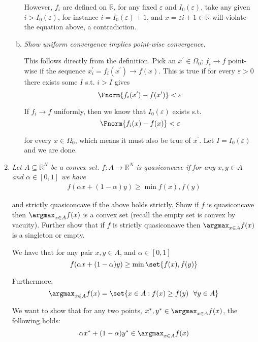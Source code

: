 \documentclass{article}
\begin{document}
\begin{enumerate}[1.]
\begin{enumerate}[a)]
        However, $f_i$ are defined on $\mathbb{R}$, for any fixed $\varepsilon$ and $I_0(\varepsilon)$, take any given $i > I_0(\varepsilon)$, for instance $i = I_0(\varepsilon) + 1$, and $x = \varepsilon i + 1 \in \mathbb{R}$ will violate the equation above, a contradiction.

      \item \textit{Show uniform convergence implies point-wise convergence.}

        \solution This follows directly from the definition. Pick an $x^\prime \in \Omega_0$; $f_i \to f$ point-wise if the sequence $x^\prime_i = f_i(x^\prime) \to f(x)$. This is true if for every $\varepsilon > 0$ there exists some $I$ s.t. $i > I$ gives
        \[
          \Fnorm{f_i(x^\prime) - f(x^\prime)} < \varepsilon
        \]

        If $f_i \to f$ uniformly, then we know that $I_0(\varepsilon)$ exists s.t.
        \[
          \Fnorm{f_i(x) - f(x)} < \varepsilon
        \]

        for every $x \in \Omega_0$, which means it must also be true of $x^\prime$. Let $I = I_0(\varepsilon)$ and we are done.
    \end{enumerate}

  \item {\itshape Let $A \subseteq \mathbb{R}^N$ be a convex set. $f: A \to \mathbb{R}^N$ is quasiconcave if for any $x, y \in A$ and $\alpha \in [0, 1]$ we have
      \begin{align*}
        f(\alpha x + (1 - \alpha) y) \ge \min{f(x), f(y)}
      \end{align*}

    and strictly quasiconcave if the above holds strictly. Show if $f$ is quasiconcave then $\argmax_{x \in A} f(x)$ is a convex set (recall the empty set is convex by vacuity). Further show that if $f$ is strictly quasiconcave then $\argmax_{x \in A} f(x)$ is a singleton or empty.}

    \solution We have that for any pair $x, y \in A$, and $\alpha \in [0, 1]$
      \[
        f(\alpha x + (1 - \alpha) y) \ge \min\set{f(x), f(y)}
      \]

      Furthermore,
      \[
        \argmax_{x \in A} f(x) = \set{x \in A: f(x) \ge f(y) ~~ \forall y \in A}
      \]

      We want to show that for any two points, $x^*, y^* \in \argmax_{x \in A} f(x)$, the following holds:
      \[
        \alpha x^* + (1 - \alpha) y^* \in \argmax_{x \in A} f(x)
      \]


\end{enumerate}
\end{document}
